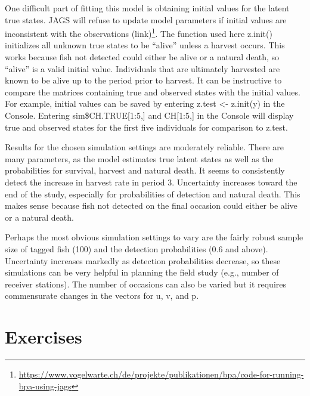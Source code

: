 \documentclass[
]{krantz}
\renewcommand{\href}[2]{#2\footnote{\url{#1}}}
\begin{document}
One difficult part of fitting this model is obtaining initial values for the latent true states. JAGS will refuse to update model parameters if initial values are inconsistent with the observations \href{https://www.vogelwarte.ch/de/projekte/publikationen/bpa/code-for-running-bpa-using-jags}{(link)}. The function used here z.init() initializes all unknown true states to be ``alive'' unless a harvest occurs. This works because fish not detected could either be alive or a natural death, so ``alive'' is a valid initial value. Individuals that are ultimately harvested are known to be alive up to the period prior to harvest. It can be instructive to compare the matrices containing true and observed states with the initial values. For example, initial values can be saved by entering z.test \textless- z.init(y) in the Console. Entering sim\$CH.TRUE{[}1:5,{]} and CH{[}1:5,{]} in the Console will display true and observed states for the first five individuals for comparison to z.test.

Results for the chosen simulation settings are moderately reliable. There are many parameters, as the model estimates true latent states as well as the probabilities for survival, harvest and natural death. It seems to consistently detect the increase in harvest rate in period 3. Uncertainty increases toward the end of the study, especially for probabilities of detection and natural death. This makes sense because fish not detected on the final occasion could either be alive or a natural death.

Perhaps the most obvious simulation settings to vary are the fairly robust sample size of tagged fish (100) and the detection probabilities (0.6 and above). Uncertainty increases markedly as detection probabilities decrease, so these simulations can be very helpful in planning the field study (e.g., number of receiver stations). The number of occasions can also be varied but it requires commensurate changes in the vectors for u, v, and p.

\hypertarget{exercises-4}{%
\section{Exercises}\label{exercises-4}}
\end{document}
